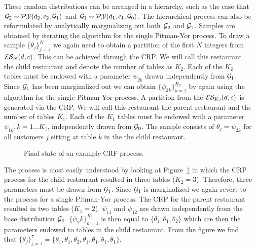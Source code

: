 These random distributions can be arranged in a hierarchy, such as the case that $\G_2 \sim \PY(d_2, c_2, \G_1)$ and $\G_1 \sim \PY(d_1, c_1, \G_0)$.  The hierarchical process can also be reformulated by analytically marginalizing out both $\G_2$ and $\G_1$.  Samples are obtained by iterating the algorithm for the single Pitman-Yor process.  To draw a sample $\{ \theta_j \}_{j = 1}^N$ we again need to obtain a partition of the first $N$ integers from $\ES_N(d,c)$.  This can be achieved through the CRP.  We will call this restaurant the child restaurant and denote the number of tables as $K_2$.  Each of the $K_2$ tables must be endowed with a parameter $ \psi_{2k}$ drawn independently from $\G_1$.  Since $\G_1$ has been marginalized out we can obtain $\{ \psi_{2k} \}_ {k = 1}^{K_2}$ by again using the algorithm for the single Pitman-Yor process.  A partition from the $\ES_{K_2}(d,c)$ is generated via the CRP.  We will call this restaurant the parent restaurant and the number of tables $K_1$.   Each of the $K_1$ tables must be endowed with a parameter $\psi_{1k}, k = 1 \ldots K_1$,  independently drawn from $\G_0$.  The sample consists of $\theta_j =\psi_{2k}$ for all customers $j$ sitting at table $k$ in the the child restaurant.

\begin{figure}[h!tbp] 
	\begin{center}
		\caption{Final state of an example CRF process.}
	\end{center} 
	\label{figHPY}
\end{figure} 

The process is most easily understood by looking at Figure~\ref{figHPY} in which the CRP process for the child restaurant resulted in three tables ($K_2 = 3$).  Therefore, three parameters must be drawn from $\G_1$.  Since $\G_1$ is marginalized we again revert to the process for a single Pitman-Yor process. The CRP for the parent restaurant resulted in two tables ($K_1 = 2$).  $\psi_{11}$ and $\psi_{12}$ are drawn independently from the base distribution $\G_0$.  $\{ \psi_2k \}_{k = 1}^{K_1}$ is then equal to $\{ \theta_1, \theta_1, \theta_2 \}$ which are then the parameters endowed to tables in the child restaurant.  From the figure we find that  $\{ \theta_j \}_{j = 1}^7 = \{ \theta_1, \theta_1, \theta_2, \theta_1, \theta_1, \theta_1, \theta_1 \}$.

